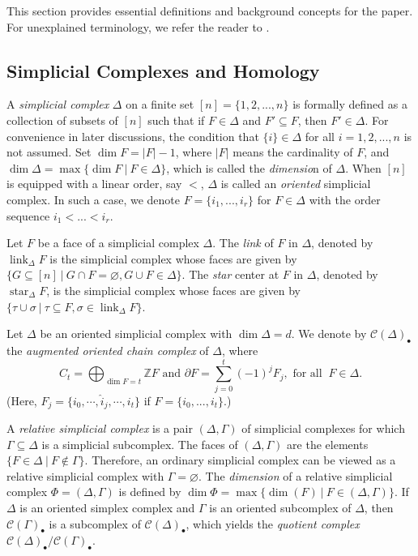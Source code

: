 \documentclass[12pt]{amsart}
\numberwithin{equation}{section}
\theoremstyle{definition}
\theoremstyle{definition}
\DeclareMathOperator{\link}{link}
\DeclareMathOperator{\starop}{star}
\begin{document}
	This section provides essential definitions and background concepts for the paper. For unexplained terminology, we refer the reader to \cite{BrunsHerzog, MS2005, Stanley}.
	
	\subsection{Simplicial Complexes and Homology}
	
	A \textit{simplicial complex} $\Delta$ on a finite set $[n]=\{1,2,...,n\}$ is formally defined as a collection of subsets of $[n]$ such that if $F\in\Delta$ and $F'\subseteq F$, then $F'\in\Delta$. For convenience in later discussions, the condition that $\{i\}\in\Delta$ for all $i=1,2,...,n$ is not assumed. 
	Set $\dim F=|F|-1$, where $|F|$ means the cardinality of $F$, and $\dim\Delta=\max\{\dim F~\big|~ F\in\Delta\}$, which is called the \emph{dimensio}n of $\Delta$. When $[n]$ is equipped with a linear order, say $<$, $\Delta$ is called an \textit{oriented} simplicial complex. In such a case, we denote $F=\{i_{1},...,i_{r}\}$ for $F\in\Delta$ with the order sequence $i_{1}<...<i_{r}$. 
	
	Let $F$ be a face of a simplicial complex $\Delta$. The \emph{link} of $F$ in $\Delta$, denoted by $\link_\Delta F$ is the simplicial complex whose faces are given by $\{G \subseteq [n] ~\big|~ G \cap F = \varnothing, G \cup F \in \Delta\}$. The \emph{star} center at $F$ in $\Delta$, denoted by $\starop_\Delta F$, is the simplicial complex whose faces are given by $\{\tau \cup \sigma ~\big|~ \tau \subseteq F, \sigma \in \link_\Delta F\}.$
	
	Let $\Delta$ be an oriented simplicial complex with $\dim\Delta=d$. We denote by $\mathcal{C}(\Delta)_{\bullet}$ the \textit{augmented oriented chain complex} of $\Delta$, where 
	$$C_{t}=\bigoplus_{\dim F=t}\mathbb{Z}F \text{ and } \partial F=\sum_{j=0}^{t}(-1)^{j}F_{j}, \text{ for all }  \ F\in\Delta.$$
	(Here, $F_{j}=\{i_{0},\cdots,\hat{i}_{j},\cdots,i_{t}\}$ if $F=\{i_{0},...,i_{t}\}$.)
	
	A \textit{relative simplicial complex} is a pair $(\Delta,\Gamma)$ of simplicial complexes for which $\Gamma\subseteq\Delta$ is a simplicial subcomplex. The faces of $(\Delta,\Gamma)$ are the elements $\{F\in\Delta ~\big|~ F\notin\Gamma\}$. Therefore, an ordinary simplicial complex can be viewed as a relative simplicial complex with $\Gamma=\varnothing$. The \emph{dimension} of a relative simplicial complex $\Phi = (\Delta,\Gamma)$ is defined by $\dim \Phi=\max \{\dim(F) ~\big|~ F\in(\Delta,\Gamma)\}$. If $\Delta$ is an oriented simplex complex and $\Gamma$ is an oriented subcomplex of $\Delta$, then $\mathcal{C}(\Gamma)_{\bullet}$ is a subcomplex of $\mathcal{C}(\Delta)_{\bullet}$, which yields the \textit{quotient complex} $\mathcal{C}(\Delta)_{\bullet}/\mathcal{C}(\Gamma)_{\bullet}$.
	
\end{document}
